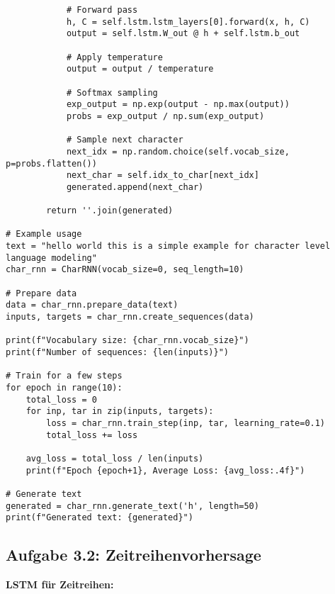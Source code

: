 ﻿\documentclass[12pt,a4paper]{article}
\begin{document}
\begin{lstlisting}
            # Forward pass
            h, C = self.lstm.lstm_layers[0].forward(x, h, C)
            output = self.lstm.W_out @ h + self.lstm.b_out
            
            # Apply temperature
            output = output / temperature
            
            # Softmax sampling
            exp_output = np.exp(output - np.max(output))
            probs = exp_output / np.sum(exp_output)
            
            # Sample next character
            next_idx = np.random.choice(self.vocab_size, p=probs.flatten())
            next_char = self.idx_to_char[next_idx]
            generated.append(next_char)
        
        return ''.join(generated)

# Example usage
text = "hello world this is a simple example for character level language modeling"
char_rnn = CharRNN(vocab_size=0, seq_length=10)

# Prepare data
data = char_rnn.prepare_data(text)
inputs, targets = char_rnn.create_sequences(data)

print(f"Vocabulary size: {char_rnn.vocab_size}")
print(f"Number of sequences: {len(inputs)}")

# Train for a few steps
for epoch in range(10):
    total_loss = 0
    for inp, tar in zip(inputs, targets):
        loss = char_rnn.train_step(inp, tar, learning_rate=0.1)
        total_loss += loss
    
    avg_loss = total_loss / len(inputs)
    print(f"Epoch {epoch+1}, Average Loss: {avg_loss:.4f}")

# Generate text
generated = char_rnn.generate_text('h', length=50)
print(f"Generated text: {generated}")
\end{lstlisting}

\subsection{Aufgabe 3.2: Zeitreihenvorhersage}

\textbf{LSTM für Zeitreihen:}
\end{document}
